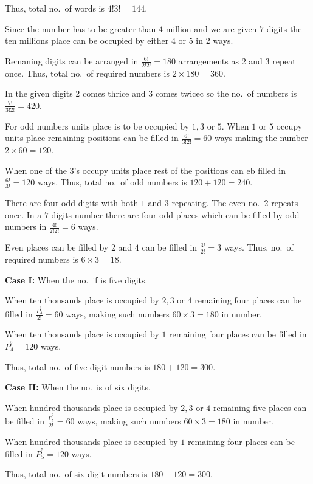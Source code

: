   Thus, total no.\ of words is $4!3! = 144$.
\item Since the number has to be greater than $4$ million and we are given $7$ digits the ten millions place
  can be occupied by either $4$ or $5$ in $2$ ways.

  Remaning digits can be arranged in $\frac{6!}{2!2!} = 180$ arrangements as $2$ and $3$ repeat once. Thus,
  total no.\ of required numbers is $2\times180 = 360$.
\item In the given digits $2$ comes thrice and $3$ comes twicec so the no.\ of numbers is $\frac{7!}{3!2!} =
  420$.

  For odd numbers units place is to be occupied by $1, 3$ or $5$. When $1$ or $5$ occupy units place
  remaining positions can be filled in $\frac{6!}{3!2!} = 60$ ways making the number $2\times60 = 120$.

  When one of the $3$'s occupy units place rest of the positions can eb filled in $\frac{6!}{3!} = 120$
  ways. Thus, total no.\ of odd numbers is $120 + 120 = 240$.
\item There are four odd digits with both $1$ and $3$ repeating. The even no.\ $2$ repeats once. In a $7$
  digits number there are four odd places which can be filled by odd numbers in $\frac{4!}{2!2!} = 6$ ways.

  Even places can be filled by $2$ and $4$ can be filled in $\frac{3!}{2!} = 3$ ways. Thus, no.\ of required
  numbers is $6\times3 = 18$.
\item {\bf Case I:} When the no.\ if is five digits.

  When ten thousands place is occupied by $2, 3$ or $4$ remaining four places can be filled in
  $\frac{P_4^^5}{2!} = 60$ ways, making such numbers $60\times3 = 180$ in number.

  When ten thousands place is occupied by $1$ remaining four places can be filled in $P_4^^5 = 120$ ways.

  Thus, total no.\ of five digit numbers is $180 + 120 = 300$.

  {\bf Case II:} When the no.\ is of six digits.

  When hundred thousands place is occupied by $2, 3$ or $4$ remaining five places can be filled in
  $\frac{P_5^^5}{2!} = 60$ ways, making such numbers $60\times3 = 180$ in number.

  When hundred thousands place is occupied by $1$ remaining four places can be filled in $P_5^^5 = 120$ ways.

  Thus, total no.\ of six digit numbers is $180 + 120 = 300$.

